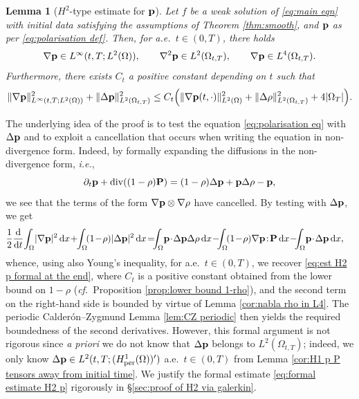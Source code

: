 \documentclass[11pt,a4paper,reqno]{amsart}
\newtheorem{lemma}[prop]{Lemma}
\theoremstyle{remark}
\theoremstyle{definition}
\numberwithin{equation}{section}
\newcommand{\per}{\mathrm{per}}
\DeclareMathOperator{\dv}{div}
\renewcommand{\P}{{\bf P}}
\newcommand{\p}{{\bf p}}
\renewcommand{\d}{\, \mathrm{d} }
\newcommand{\der}{\mathrm{d}}
\begin{document}
\begin{lemma}[$H^2$-type estimate for $\p$]\label{lem:H2 for p}
Let $f$ be a weak solution of \eqref{eq:main eqn} with initial data satisfying the assumptions of Theorem \ref{thm:smooth}, and $\p$ as per \eqref{eq:polarisation def}. Then, for a.e.~$t \in (0,T)$, there holds 
    \begin{equation*}
      \nabla \p \in L^\infty(t,T;L^2(\Omega)), \qquad  \nabla^2 \p \in L^2(\Omega_{t,T}), \qquad \nabla \p \in L^4(\Omega_{t,T}). 
    \end{equation*}
    Furthermore, there exists $C_t$ a positive constant depending on $t$ such that 
    \begin{equation}\label{eq:est H2 p formal at the end}
    \begin{aligned}
         \Vert \nabla \p \Vert^2_{L^\infty(t,T;L^2(\Omega))} + \Vert \Delta \p \Vert^2_{L^2(\Omega_{t,T})} \leq C_t\Big(\Vert \nabla \p(t,\cdot) \Vert^2_{L^2(\Omega)} + \Vert \Delta \rho\Vert_{L^2(\Omega_{t,T})}^2 + 4|\Omega_T| \Big). 
    \end{aligned}
    \end{equation}
\end{lemma}
The underlying idea of the proof is to test the equation \eqref{eq:polarisation eq} with $\Delta \p$ and to exploit a cancellation that occurs when writing the equation in non-divergence form. Indeed, by formally expanding the diffusions in the non-divergence form, \textit{i.e.}, 
    \begin{equation}\label{eq:non div form p eqn}
        \partial_t \p + \dv((1-\rho)\P) = (1-\rho)\Delta \p + \p \Delta \rho - \p, 
    \end{equation}
 we see that the terms of the form $\nabla \p \otimes \nabla \rho$ have cancelled. By testing with $\Delta \p$, we get 
    \begin{equation}\label{eq:formal estimate H2 p}
    \begin{aligned}
         \frac{1}{2}\frac{\der}{\der t}\!\int_\Omega\! |\nabla \p |^2 \d x \!+\!\! \int_\Omega \! (1\!-\!\rho) & |\Delta \p |^2 \d x \!=\!\! \!\int_\Omega \! \p\! \cdot\! \Delta \p \Delta \rho \d x \!- \!\!\!\int_\Omega \!(1\!-\!\rho) \nabla \p \!:\! \P \d x \!- \!\!\!\int_\Omega \!\p \!\cdot \!\Delta \p \d x, 
    \end{aligned}
    \end{equation}
    whence, using also Young's inequality, for a.e.~$t \in (0,T)$, we recover \eqref{eq:est H2 p formal at the end}, where $C_t$ is a positive constant obtained from the lower bound on $1-\rho$ (\textit{cf.}~Proposition \ref{prop:lower bound 1-rho}), and the second term on the right-hand side is bounded by virtue of Lemma \ref{cor:nabla rho in L4}. The periodic Calder\'on--Zygmund Lemma \ref{lem:CZ periodic} then yields the required boundedness of the second derivatives. However, this formal argument is not rigorous since \emph{a priori} we do not know that $\Delta \p$ belongs to $L^2(\Omega_{t,T})$; indeed, we only know $\Delta \p \in L^2(t,T;(H^1_\per(\Omega))')$ a.e.~$t \in (0,T)$ from Lemma \ref{cor:H1 p P tensors away from initial time}. We justify the formal estimate \eqref{eq:formal estimate H2 p} rigorously in \S \ref{sec:proof of H2 via galerkin}. 
\end{document}
